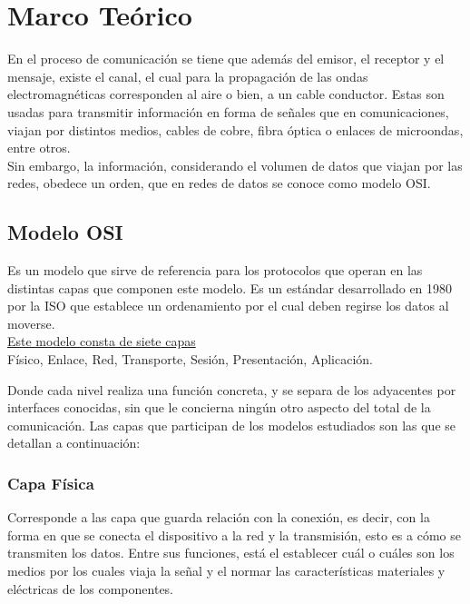 \chapter{Marco Teórico}

En el proceso de comunicación se tiene que además del emisor, el receptor y el mensaje, existe el canal, el cual para la propagación de las ondas electromagnéticas corresponden al aire o bien, a un cable conductor. Estas son usadas para transmitir información en forma de señales que en comunicaciones, viajan por distintos medios, cables de cobre, fibra óptica o enlaces de microondas, entre otros.\\

Sin embargo, la información, considerando el volumen de datos que viajan por las redes, obedece un orden, que en redes de datos se conoce como modelo OSI.\\

\section{Modelo OSI}

Es un modelo que sirve de referencia para los protocolos que operan en las distintas capas que componen este modelo. Es un estándar desarrollado en 1980 por la ISO que establece un ordenamiento por el cual deben regirse los datos al moverse.\\

\newpage
\underline{Este modelo consta de siete capas}\\

Físico, Enlace, Red, Transporte, Sesión, Presentación, Aplicación.

Donde cada nivel realiza una función concreta, y se separa de los adyacentes por interfaces conocidas, sin que le concierna ningún otro aspecto del total de la comunicación.  Las capas que participan de los modelos estudiados son las que se detallan a continuación:

\subsection{Capa Física}

Corresponde a las capa que guarda relación con la conexión, es decir, con la forma en que se conecta el dispositivo a la red y la transmisión, esto es a cómo se transmiten los datos. Entre sus funciones, está el establecer cuál o cuáles son los medios por los cuales viaja la señal y el normar las características materiales y eléctricas de los componentes.\\

